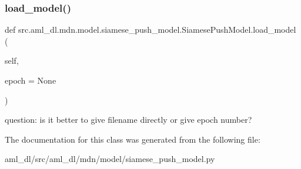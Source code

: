 \subsubsection{\texorpdfstring{load\+\_\+model()}{load\_model()}}
{\footnotesize\ttfamily def src.\+aml\+\_\+dl.\+mdn.\+model.\+siamese\+\_\+push\+\_\+model.\+Siamese\+Push\+Model.\+load\+\_\+model (\begin{DoxyParamCaption}\item[{}]{self,  }\item[{}]{epoch = {\ttfamily None} }\end{DoxyParamCaption})}

\begin{DoxyVerb}question: is it better to give filename directly or give epoch number?
\end{DoxyVerb}
 

The documentation for this class was generated from the following file\+:\begin{DoxyCompactItemize}
\item 
aml\+\_\+dl/src/aml\+\_\+dl/mdn/model/siamese\+\_\+push\+\_\+model.\+py\end{DoxyCompactItemize}
